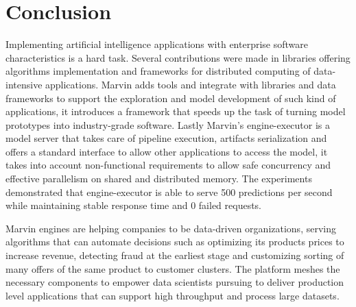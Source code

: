 \documentclass[twoside,11pt]{article}
\begin{document}
\section{Conclusion}
Implementing artificial intelligence applications with enterprise software characteristics is a hard task. Several contributions were made in libraries offering algorithms implementation and frameworks for distributed computing of data-intensive applications. Marvin adds tools and integrate with libraries and data frameworks to support the exploration and model development of such kind of applications, it introduces a framework that speeds up the task of turning model prototypes into industry-grade software. Lastly Marvin's engine-executor is a model server that takes care of pipeline execution, artifacts serialization and offers a standard interface to allow other applications to access the model, it takes into account non-functional requirements to allow safe concurrency and effective parallelism on shared and distributed memory. The experiments demonstrated that engine-executor is able to serve 500 predictions per second while maintaining stable response time and 0 failed requests.

Marvin engines are helping companies to be data-driven organizations, serving algorithms that can automate decisions such as optimizing its products prices to increase revenue, detecting fraud at the earliest stage and customizing sorting of many offers of the same product to customer clusters. The platform meshes the necessary components to empower data scientists pursuing to deliver production level applications that can support high throughput and process large datasets.


\newpage



\end{document}
